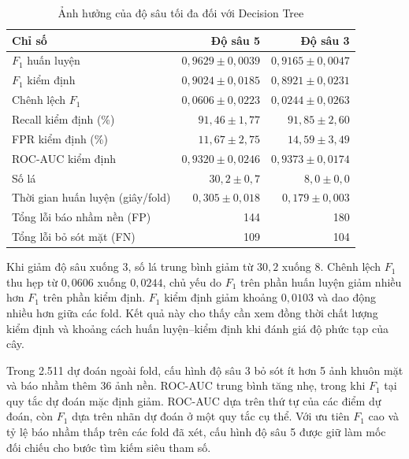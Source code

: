 \documentclass[12pt,a4paper,oneside]{report}
\begin{document}
\begin{table}[htbp]
    \centering
    \small
    \caption{Ảnh hưởng của độ sâu tối đa đối với Decision Tree}
    \label{tab:week8_dt_depth_results}
    \begin{tabularx}{\linewidth}{@{}Xrr@{}}
        \toprule
        \textbf{Chỉ số} & \textbf{Độ sâu 5} & \textbf{Độ sâu 3} \\
        \midrule
        $F_1$ huấn luyện & $0{,}9629 \pm 0{,}0039$ & $0{,}9165 \pm 0{,}0047$ \\
        $F_1$ kiểm định & $0{,}9024 \pm 0{,}0185$ & $0{,}8921 \pm 0{,}0231$ \\
        Chênh lệch $F_1$ & $0{,}0606 \pm 0{,}0223$ & $0{,}0244 \pm 0{,}0263$ \\
        Recall kiểm định (\%) & $91{,}46 \pm 1{,}77$ & $91{,}85 \pm 2{,}60$ \\
        FPR kiểm định (\%) & $11{,}67 \pm 2{,}75$ & $14{,}59 \pm 3{,}49$ \\
        ROC-AUC kiểm định & $0{,}9320 \pm 0{,}0246$ & $0{,}9373 \pm 0{,}0174$ \\
        Số lá & $30{,}2 \pm 0{,}7$ & $8{,}0 \pm 0{,}0$ \\
        Thời gian huấn luyện (giây/fold) & $0{,}305 \pm 0{,}018$ & $0{,}179 \pm 0{,}003$ \\
        Tổng lỗi báo nhầm nền (FP) & 144 & 180 \\
        Tổng lỗi bỏ sót mặt (FN) & 109 & 104 \\
        \bottomrule
    \end{tabularx}
\end{table}

Khi giảm độ sâu xuống 3, số lá trung bình giảm từ $30{,}2$ xuống $8$.
Chênh lệch $F_1$ thu hẹp từ $0{,}0606$ xuống $0{,}0244$, chủ yếu do
$F_1$ trên phần huấn luyện giảm nhiều hơn $F_1$ trên phần kiểm định.
$F_1$ kiểm định giảm khoảng $0{,}0103$ và dao động nhiều hơn giữa các
fold. Kết quả này cho thấy cần xem đồng thời chất lượng kiểm định và
khoảng cách huấn luyện--kiểm định khi đánh giá độ phức tạp của cây.

Trong 2.511 dự đoán ngoài fold, cấu hình độ sâu 3 bỏ sót ít hơn 5 ảnh
khuôn mặt và báo nhầm thêm 36 ảnh nền. ROC-AUC trung bình tăng nhẹ,
trong khi $F_1$ tại quy tắc dự đoán mặc định giảm. ROC-AUC dựa trên
thứ tự của các điểm dự đoán, còn $F_1$ dựa trên nhãn dự đoán ở một
quy tắc cụ thể. Với ưu tiên $F_1$
cao và tỷ lệ báo nhầm thấp trên các fold đã xét, cấu hình độ sâu 5
được giữ làm mốc đối chiếu cho bước tìm kiếm siêu tham số.
\end{document}
